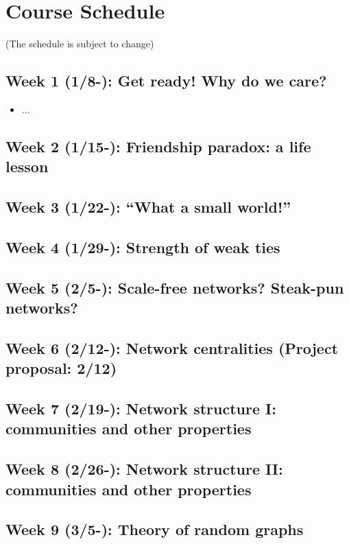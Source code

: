 \documentclass[11pt,article,oneside]{memoir} %
\begin{document}
\section{Course Schedule} %

(The schedule is subject to change)

\subsection{Week 1 (1/8-):  Get ready! Why do we care?}

\vspace{-0.2em}\begin{itemize}\itemsep0em
\item ...
\end{itemize}

\subsection{Week 2 (1/15-):  Friendship paradox: a life lesson}
\subsection{Week 3 (1/22-):  ``What a small world!''}
\subsection{Week 4 (1/29-):  Strength of weak ties}
\subsection{Week 5 (2/5-):  Scale-free networks? Steak-pun networks?}
\subsection{Week 6 (2/12-):  Network centralities (Project proposal: 2/12)}
\subsection{Week 7 (2/19-):  Network structure I: communities and other properties}
\subsection{Week 8 (2/26-):  Network structure II: communities and other properties}
\subsection{Week 9 (3/5-):  Theory of random graphs}
\end{document}
